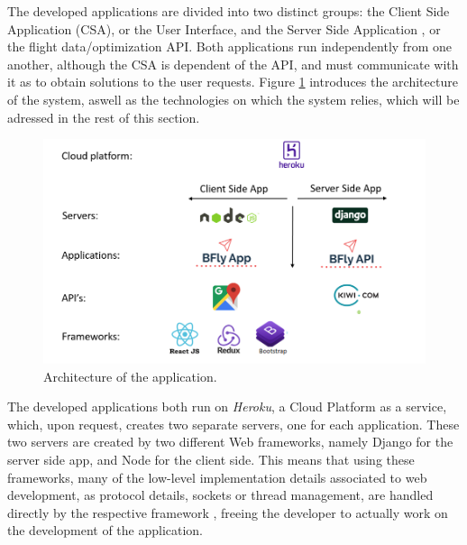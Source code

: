 
The developed applications are divided into two distinct groups: the Client Side Application (CSA), or the User Interface,
and the Server Side Application , or the flight data/optimization API.
Both applications run independently from one another, although the CSA is dependent of the API,
and must communicate with it as to obtain solutions to the user requests.
Figure \ref{fig:system_architecture} introduces the architecture of the system,
aswell as the technologies on which the system relies, which will be adressed in the rest of this section. 


\begin{figure}[H]
  \centering
  \includegraphics[width=\textwidth]{Figures/system_implementation/system_architecture_implementation.png}
  \caption{Architecture of the application.}
  \label{fig:system_architecture}  
\end{figure}



The developed applications both run on \textit{Heroku}, a Cloud Platform as a service, 
which, upon request, creates two separate servers, one for each application. 
These two servers are created by two different Web frameworks, namely Django for the server side app,
and Node for the client side. This means that using these frameworks, many of the low-level
implementation details associated to web development, as protocol details, sockets or thread management,
are handled directly by the respective framework \cite{python_wiki}, freeing the developer to actually work on the development 
of the application.